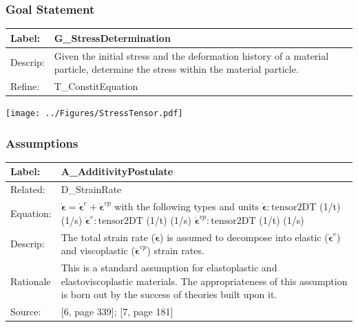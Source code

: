 \documentclass[t,12pt,numbers,fleqn]{beamer}
\newcommand{\colAwidth}{0.15\textwidth}
\newcommand{\colBwidth}{0.7\textwidth}
\begin{document}

\begin{frame}

\frametitle{Goal Statement}

\noindent
\begin{minipage}{\textwidth}
\begin{tabular}{| p{\colAwidth} | p{\colBwidth}|}
\hline
\rowcolor[gray]{0.9}
Label: & G\_StressDetermination\\ \hline
Descrip: & Given the initial stress and the deformation history of a material particle, determine the stress
within the material particle.\\
\hline
Refine: & {T\_ConstitEquation}\\ \hline
\end{tabular}
\end{minipage}

\begin{center}
{
\texttt{[image: ../Figures/StressTensor.pdf]}
}
\end{center}

\end{frame}


\begin{frame}

\frametitle{Assumptions}

\begin{minipage}{\textwidth}
\begin{tabular}{| p{\colAwidth} | p{\colBwidth}|}
\hline
\rowcolor[gray]{0.9}
Label: & A\_AdditivityPostulate\\ \hline
Related: & {D\_StrainRate}\\ \hline
Equation: & $\dot{\bm{\epsilon}} = \dot{\bm{\epsilon}}^e + \dot{\bm{\epsilon}}^{\mathit{vp}}$\newline
with the following types and units\newline
$\dot{\bm{\epsilon}}: \mbox{tensor2DT}$ (1/t) (1/s)\newline
$\dot{\bm{\epsilon}}^e: \mbox{tensor2DT}$ (1/t) (1/s)\newline
$\dot{\bm{\epsilon}}^{\mathit{vp}}: \mbox{tensor2DT}$ (1/t) (1/s)\\ \hline
Descrip: & The total strain rate ($\dot{\bm{\epsilon}}$) is assumed to decompose into elastic
($\dot{\bm{\epsilon}}^e$) and viscoplastic ($\dot{\bm{\epsilon}}^{\mathit{vp}}$)
strain rates.\\ \hline 
Rationale & This is a standard assumption for elastoplastic and elastoviscoplastic materials.  The 
appropriateness of this assumption is born out by the success of theories built upon it.\\ \hline
Source: & [6, page 339]; [7, page 181]\\ \hline %
\end{tabular}
\end{minipage}

\end{frame}
\end{document}
